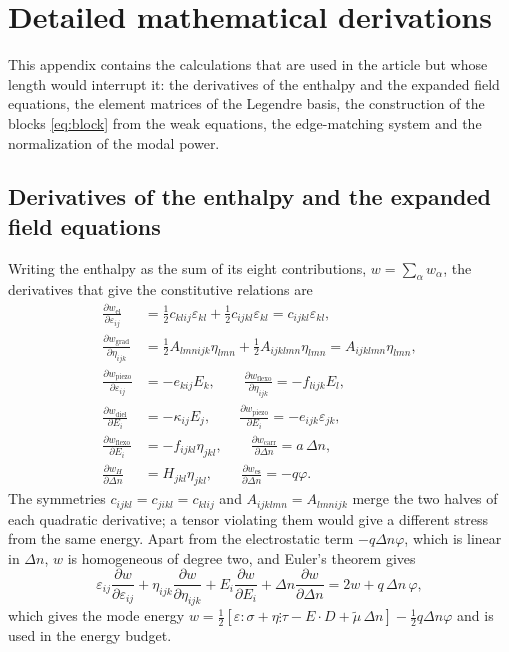 \section{Detailed mathematical derivations}
\label{app:derivations}

This appendix contains the calculations that are used in the article but whose
length would interrupt it: the derivatives of the enthalpy and the expanded field equations, the element matrices of the Legendre basis, the construction of the blocks \eqref{eq:block} from the
weak equations, the edge-matching system and the normalization of the modal power.

\subsection{Derivatives of the enthalpy and the expanded field equations}

Writing the enthalpy as the sum of its eight contributions, $w=\sum_\alpha w_\alpha$, the derivatives that give the constitutive relations are
\begin{align*}
\frac{\partial w_{\text{el}}}{\partial\varepsilon_{ij}}
&=\tfrac12 c_{klij}\varepsilon_{kl}+\tfrac12 c_{ijkl}\varepsilon_{kl}
=c_{ijkl}\varepsilon_{kl},\\[2pt]
\frac{\partial w_{\text{grad}}}{\partial\eta_{ijk}}
&=\tfrac12 A_{lmnijk}\eta_{lmn}+\tfrac12 A_{ijklmn}\eta_{lmn}
=A_{ijklmn}\eta_{lmn},\\[2pt]
\frac{\partial w_{\text{piezo}}}{\partial\varepsilon_{ij}}&=-e_{kij}E_k,
\qquad
\frac{\partial w_{\text{flexo}}}{\partial\eta_{ijk}}=-f_{lijk}E_l,\\[2pt]
\frac{\partial w_{\text{diel}}}{\partial E_i}&=-\kappa_{ij}E_j,
\qquad
\frac{\partial w_{\text{piezo}}}{\partial E_i}=-e_{ijk}\varepsilon_{jk},\\[2pt]
\frac{\partial w_{\text{flexo}}}{\partial E_i}&=-f_{ijkl}\eta_{jkl},
\qquad
\frac{\partial w_{\text{carr}}}{\partial\Delta n}=a\,\Delta n,\\[2pt]
\frac{\partial w_{H}}{\partial\Delta n}&=H_{jkl}\eta_{jkl},
\qquad
\frac{\partial w_{\text{es}}}{\partial\Delta n}=-q\varphi .
\end{align*}
The symmetries $c_{ijkl}=c_{jikl}=c_{klij}$ and $A_{ijklmn}=A_{lmnijk}$ merge the two halves of each quadratic derivative; a tensor violating them would give a different stress from the same energy.  Apart from the electrostatic term $-q\Delta n\varphi$, which is linear in $\Delta n$, $w$ is homogeneous of degree two, and Euler's theorem gives
\begin{equation*}
\varepsilon_{ij}\frac{\partial w}{\partial\varepsilon_{ij}}
+\eta_{ijk}\frac{\partial w}{\partial\eta_{ijk}}
+E_i\frac{\partial w}{\partial E_i}
+\Delta n\frac{\partial w}{\partial\Delta n}
=2w+q\,\Delta n\,\varphi ,
\end{equation*}
which gives the mode energy $w=\tfrac12[\varepsilon:\sigma+\eta\vdots\tau-E\cdot D+\widetilde\mu\,\Delta n]-\tfrac12 q\Delta n\varphi$ and is used in the energy budget.

